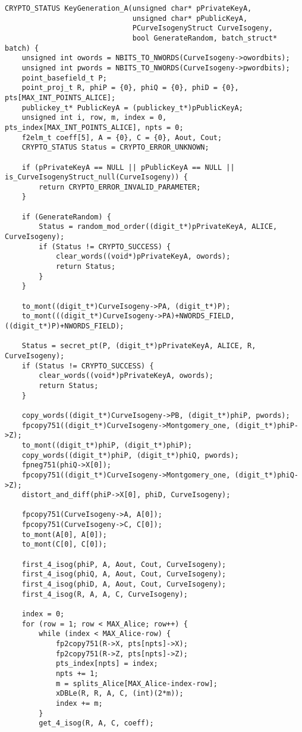 \begin{lstlisting}[basicstyle=\footnotesize,]
CRYPTO_STATUS KeyGeneration_A(unsigned char* pPrivateKeyA,
                              unsigned char* pPublicKeyA, 
							  PCurveIsogenyStruct CurveIsogeny,
							  bool GenerateRandom, batch_struct* batch) { 
	unsigned int owords = NBITS_TO_NWORDS(CurveIsogeny->owordbits);
	unsigned int pwords = NBITS_TO_NWORDS(CurveIsogeny->pwordbits);
	point_basefield_t P;
	point_proj_t R, phiP = {0}, phiQ = {0}, phiD = {0}, pts[MAX_INT_POINTS_ALICE];
	publickey_t* PublicKeyA = (publickey_t*)pPublicKeyA;
	unsigned int i, row, m, index = 0, pts_index[MAX_INT_POINTS_ALICE], npts = 0; 
	f2elm_t coeff[5], A = {0}, C = {0}, Aout, Cout;
	CRYPTO_STATUS Status = CRYPTO_ERROR_UNKNOWN; 

	if (pPrivateKeyA == NULL || pPublicKeyA == NULL || is_CurveIsogenyStruct_null(CurveIsogeny)) {
		return CRYPTO_ERROR_INVALID_PARAMETER;
	}  

	if (GenerateRandom) {
		Status = random_mod_order((digit_t*)pPrivateKeyA, ALICE, CurveIsogeny);    
		if (Status != CRYPTO_SUCCESS) {
			clear_words((void*)pPrivateKeyA, owords);
			return Status;
		}
	}

	to_mont((digit_t*)CurveIsogeny->PA, (digit_t*)P);
	to_mont(((digit_t*)CurveIsogeny->PA)+NWORDS_FIELD, ((digit_t*)P)+NWORDS_FIELD); 

	Status = secret_pt(P, (digit_t*)pPrivateKeyA, ALICE, R, CurveIsogeny);
	if (Status != CRYPTO_SUCCESS) {
		clear_words((void*)pPrivateKeyA, owords);
		return Status;
	}

	copy_words((digit_t*)CurveIsogeny->PB, (digit_t*)phiP, pwords);
	fpcopy751((digit_t*)CurveIsogeny->Montgomery_one, (digit_t*)phiP->Z);  
	to_mont((digit_t*)phiP, (digit_t*)phiP);                                        
	copy_words((digit_t*)phiP, (digit_t*)phiQ, pwords);
	fpneg751(phiQ->X[0]);   
	fpcopy751((digit_t*)CurveIsogeny->Montgomery_one, (digit_t*)phiQ->Z); 
	distort_and_diff(phiP->X[0], phiD, CurveIsogeny);

	fpcopy751(CurveIsogeny->A, A[0]);
	fpcopy751(CurveIsogeny->C, C[0]);
	to_mont(A[0], A[0]);
	to_mont(C[0], C[0]);

	first_4_isog(phiP, A, Aout, Cout, CurveIsogeny);     
	first_4_isog(phiQ, A, Aout, Cout, CurveIsogeny);
	first_4_isog(phiD, A, Aout, Cout, CurveIsogeny);
	first_4_isog(R, A, A, C, CurveIsogeny);
    
	index = 0;        
	for (row = 1; row < MAX_Alice; row++) {
		while (index < MAX_Alice-row) {
			fp2copy751(R->X, pts[npts]->X);
			fp2copy751(R->Z, pts[npts]->Z);
			pts_index[npts] = index;
			npts += 1;
			m = splits_Alice[MAX_Alice-index-row];
			xDBLe(R, R, A, C, (int)(2*m));
			index += m;
		}
		get_4_isog(R, A, C, coeff);        


\end{lstlisting}
